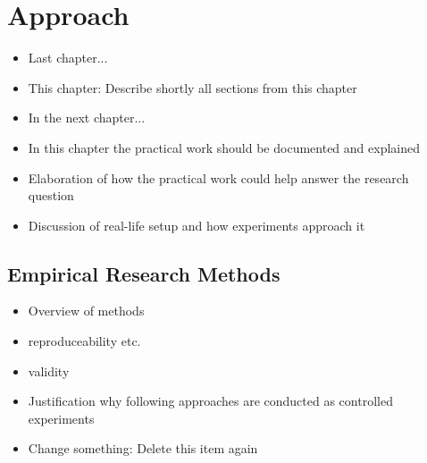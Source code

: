 \chapter{Approach}

\begin{itemize}
	\item Last chapter...
	\item This chapter: Describe shortly all sections from this chapter
	\item In the next chapter...
\end{itemize}

\begin{itemize}
\item In this chapter the practical work should be documented and explained
\item Elaboration of how the practical work could help answer the research question
\item Discussion of real-life setup and how experiments approach it
\end{itemize}








\section{Empirical Research Methods}


\begin{itemize}
\item Overview of methods
\item reproduceability etc.
\item validity
\item Justification why following approaches are conducted as controlled experiments
\item Change something: Delete this item again
\end{itemize}




